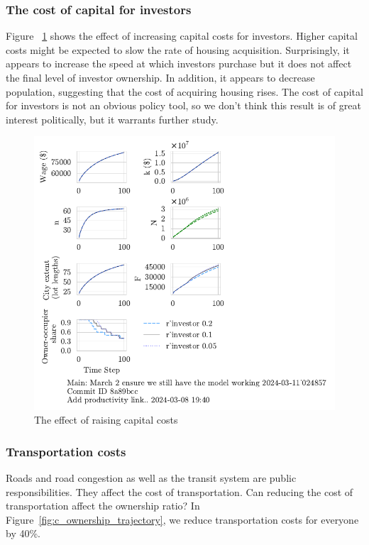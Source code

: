 \subsubsection{The cost of capital for investors}
Figure ~\ref{fig:capital_ownership_trajectory} shows the effect of increasing capital costs for investors. Higher capital costs might be expected to slow the rate of housing acquisition. Surprisingly, it appears to increase the speed at which investors purchase but it does not affect the final level of investor ownership.  In addition, it appears to decrease population, suggesting that the cost of acquiring housing rises. The cost of capital for investors is not an obvious policy tool, so we don't think this result is of great interest politically, but it warrants further study.
\begin{figure}[h!t]
    \centering
    \includegraphics[scale=.8, trim={0 1.4cm 0 0},clip]{fig/r_investor-Main-024857.pdf}
    \caption{The effect of raising capital costs}
    \label{fig:capital_ownership_trajectory}
\end{figure}

\newpage
\subsubsection{Transportation costs}
Roads and road congestion as well as the transit system are public responsibilities. They affect the cost of transportation. Can reducing the cost of transportation affect the ownership ratio? In Figure~\ref{fig:c_ownership_trajectory}, we reduce transportation costs for everyone by 40\%. 


